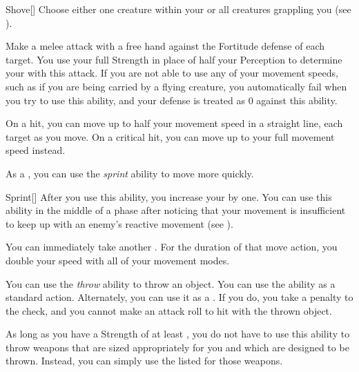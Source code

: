         \begin{activeability}{Shove}[]
            \rankline
            Choose either one creature within your  or all creatures grappling you (see ).

            Make a melee attack with a free hand against the Fortitude defense of each target.
            You use your full Strength in place of half your Perception to determine your  with this attack.
            If you are not able to use any of your movement speeds, such as if you are being carried by a flying creature, you automatically fail when you try to use this ability, and your defense is treated as 0 against this ability.

            On a hit, you can move up to half your movement speed in a straight line,  each target as you move.
            On a critical hit, you can move up to your full movement speed instead.
        \end{activeability}

        \label{Sprint} As a , you can use the \textit{sprint} ability to move more quickly.

        \begin{activeability}{Sprint}[]
            \rankline
            After you use this ability, you increase your  by one.
            You can use this ability in the middle of a phase after noticing that your movement is insufficient to keep up with an enemy's reactive movement (see ).

            You can immediately take another .
            For the duration of that move action, you double your speed with all of your movement modes.
        \end{activeability}

        \label{Throw} You can use the \textit{throw} ability to throw an object.
        You can use the ability as a standard action.
        Alternately, you can use it as a .
        If you do, you take a  penalty to the check, and you cannot make an attack roll to hit with the thrown object.

        As long as you have a Strength of at least , you do not have to use this ability to throw weapons that are sized appropriately for you and which are designed to be thrown.
        Instead, you can simply use the listed  for those weapons.

